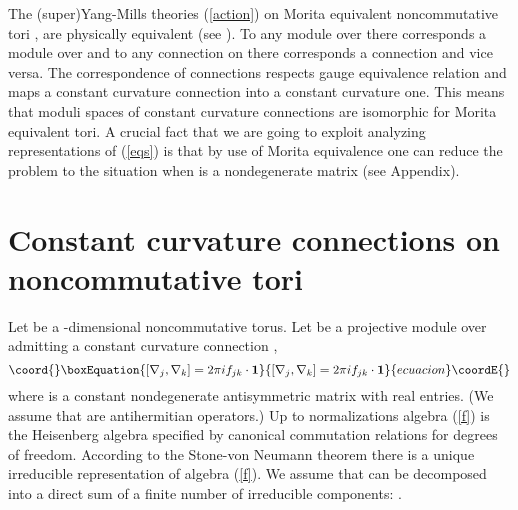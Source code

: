 \documentclass[a4paper,a4paper]{article}
\begin{document}
The (super)Yang-Mills theories (\ref{action}) on Morita equivalent noncommutative tori \coordHE{}, \coordHE{} 
are physically equivalent (see \cite{ASMorita}).
To any module \coordHE{} over \coordHE{} there corresponds a module \coordHE{} over \coordHE{} and to any connection 
\myHighlight{$\nabla$}\coordHE{} on \coordHE{} there corresponds a connection \myHighlight{$\hat \nabla$}\coordHE{} and vice versa. The correspondence of connections 
respects gauge equivalence relation and maps a constant curvature connection into a constant curvature one. This 
means that moduli spaces of constant curvature connections are isomorphic for Morita equivalent tori.  
 A crucial fact that we are going to exploit analyzing representations of (\ref{eqs}) is that by use of Morita equivalence 
one can reduce the problem to the situation when \coordHE{} is a nondegenerate matrix (see Appendix). 



\section{Constant curvature connections on noncommutative tori}
Let \coordHE{} be a \coordHE{}-dimensional noncommutative torus.
Let \coordHE{} be a projective module over \coordHE{} admitting a constant
curvature connection \coordHE{}, \coordHE{} 
\begin{equation}\coord{}\boxEquation{ \label{f}
[\nabla_{j}, \nabla_{k} ] = 2\pi  if_{jk} \cdot {\bf 1} 
}{ [\nabla_{j}, \nabla_{k} ] = 2\pi  if_{jk} \cdot {\bf 1} 
}{ecuacion}\coordE{}\end{equation}
where \coordHE{} is a constant nondegenerate antisymmetric matrix with real entries. 
(We assume that \coordHE{} are antihermitian operators.)
Up to normalizations  algebra (\ref{f}) is the Heisenberg algebra 
specified by  canonical commutation relations for \coordHE{} degrees of freedom. 
According to the Stone-von Neumann theorem there is a unique irreducible representation  \coordHE{} of  algebra (\ref{f}).
We assume that \coordHE{} can be decomposed into a direct sum of a finite number of irreducible components: 
\coordHE{}. 
\end{document}
